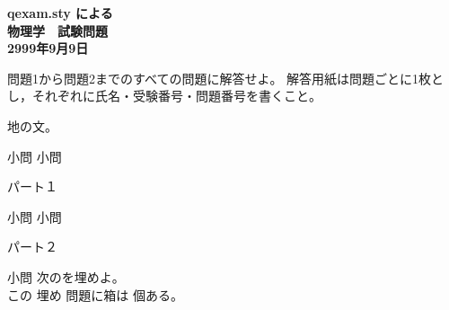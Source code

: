 \documentclass[11pt,a4j]{jarticle}
\begin{document}


\begin{center}
	\textbf{\Large  qexam.sty による\\
	\bigskip
	物理学　試験問題}\\
	\bigskip
	\textbf{\large 2999年9月9日}
\end{center}

問題1から問題2までのすべての問題に解答せよ。
解答用紙は問題ごとに1枚とし，それぞれに氏名・受験番号・問題番号を書くこと。

地の文。
\begin{qlist}
	\qitem 小問
	\qitem 小問
\end{qlist}

\begin{qparts}
	\qpart パート１
		\begin{qlist}
			\qitem 小問
			\qitem 小問
		\end{qlist}
	\qpart パート２
		\begin{qlist}
			\qitem 小問
			\qitem 次の\qbox{(a) -- (b)}を埋めよ。\\
				この \qbox{}埋め 問題に箱は \qbox{}個ある。
		\end{qlist}
\end{qparts}
\end{document}
